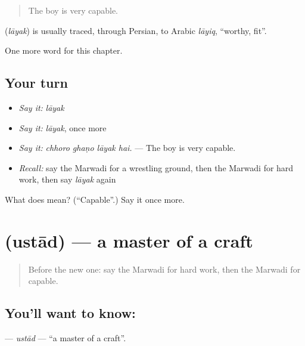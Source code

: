 \begin{quote}
The boy is very capable.
\end{quote}

\begin{cousinweb}
\textbf{} (\emph{lāyak}) is usually traced, through Persian, to Arabic \emph{lāyiq}, \textquotedblleft{}worthy, fit\textquotedblright{}.
\end{cousinweb}

\begin{grammarlens}[title={What you've built}]
One more word for this chapter.
\end{grammarlens}

\subsection*{Your turn}
\begin{itemize}
\raggedright
  \item \emph{Say it:} \emph{lāyak}
  \item \emph{Say it:} \emph{lāyak}, once more
  \item \emph{Say it:} \emph{chhoro ghaṇo lāyak hai.} — The boy is very capable.
  \item \emph{Recall:} say the Marwadi for a wrestling ground, then the Marwadi for hard work, then say \emph{lāyak} again
\end{itemize}

\begin{tcolorbox}[breakable,colback=teal!4,colframe=teal!35!black,title={Before you move on}]
What does  mean? (\textquotedblleft{}Capable\textquotedblright{}.) Say it once more.
\end{tcolorbox}
\section[\texorpdfstring{\mw{उस्ताद} (ustād)}{उस्ताद (ustād)}]{ (ustād) — a master of a craft}

\label{lesson:MW-C288-ustad}



\begin{quote}
Before the new one: say the Marwadi for hard work, then the Marwadi for capable.
\end{quote}

\subsection*{You'll want to know: }
\textbf{} — \emph{ustād} — \textquotedblleft{}a master of a craft\textquotedblright{}.

